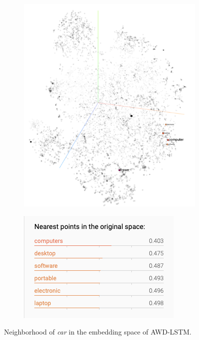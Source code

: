 \begin{figure}
\centering
\begin{subfigure}{.5\textwidth}
  \centering
  \includegraphics[width=\linewidth]{figures/computer_emb_neighbors.png}
  \label{car:neighborhood}
\end{subfigure}%
\begin{subfigure}{.5\textwidth}
  \centering
  \includegraphics[width=\linewidth]{figures/computer_nearest_neighbors.png}
  \label{car:neighbor}
\end{subfigure}
\caption{Neighborhood of \emph{car} in the embedding space of AWD-LSTM.}
\label{car}
\end{figure}

